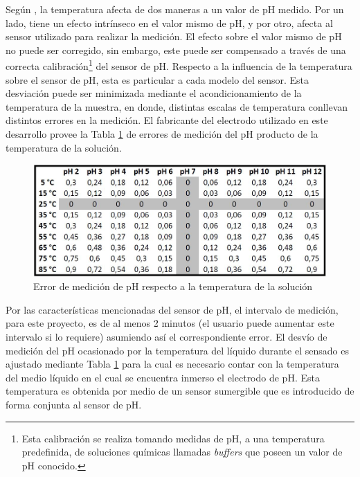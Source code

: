             Según \cite{ElArabe}, la temperatura afecta de dos maneras a un valor de pH medido. Por un lado, tiene un efecto intrínseco en el valor mismo de pH, y por otro, afecta al sensor utilizado para realizar la medición. El efecto sobre el valor mismo de pH no puede ser corregido, sin embargo, este puede ser compensado a través de una correcta calibración\footnote{ Esta calibración se realiza tomando medidas de pH, a una temperatura predefinida, de soluciones químicas llamadas \textit{buffers} que poseen un valor de pH conocido.} del sensor de pH. Respecto a la influencia de la temperatura sobre el sensor de pH, esta es particular a cada modelo del sensor. Esta desviación puede ser minimizada mediante el acondicionamiento de la temperatura de la muestra, en donde, distintas escalas de temperatura conllevan distintos errores en la medición. El fabricante del electrodo utilizado en este desarrollo provee la Tabla \ref{tablePhvsTemp} de errores de medición del pH producto de la temperatura de la solución.
            
            \begin{figure}[h] 
                \centering
                \includegraphics[scale=0.6]{hardware/ErrorMedicionPH.jpg}
                \caption{Error de medición de pH respecto a la temperatura de la solución}
                \label{tablePhvsTemp}
            \end{figure}
            
            \par Por las características mencionadas del sensor de pH, el intervalo de medición, para este proyecto, es de al menos 2 minutos (el usuario puede aumentar este intervalo si lo requiere) asumiendo así el correspondiente error. El desvío de medición del pH ocasionado por la temperatura del líquido durante el sensado es ajustado mediante Tabla \ref{tablePhvsTemp} para la cual es necesario contar con la temperatura del medio líquido en el cual se encuentra inmerso el electrodo de pH. Esta temperatura es obtenida por medio de un sensor sumergible que es introducido de forma conjunta al sensor de pH.
        
